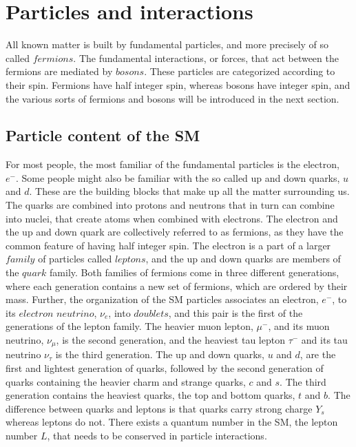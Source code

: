 \section{Particles and interactions}  
\noindent\justify
All known matter is built by fundamental particles, and more precisely of so called $fermions$. 
The fundamental interactions, or forces, that act between the fermions are mediated by $bosons$. 
These particles are categorized according to their spin. 
Fermions have half integer spin, whereas bosons have integer spin, and the various sorts of fermions and bosons will be introduced in the next section. 
\subsection*{Particle content of the SM}  
\noindent\justify
For most people, the most familiar of the fundamental particles is the electron, $e^{-}$. 
Some people might also be familiar with the so called up and down quarks, $u$ and $d$. 
These are the building blocks that make up all the matter surrounding us. 
The quarks are combined into protons and neutrons that in turn can combine into nuclei, that create atoms when combined with electrons. 
The electron and the up and down quark are collectively referred to as fermions, as they have the common feature of having half integer spin. 
The electron is a part of a larger $family$ of particles called $leptons$, and the up and down quarks are members of the $quark$ family.
Both families of fermions come in three different generations, where each generation contains a new set of fermions, which are ordered by their mass. 
Further, the organization of the SM particles associates an electron, $e^{-}$, to its $electron$ $neutrino$, $\nu_{e}$, into $doublets$, and this pair is the first of the generations of the lepton family. 
The heavier muon lepton, $\mu^{-}$, and its muon neutrino, $\nu_{\mu}$, is the second generation, and the heaviest tau lepton $\tau^{-}$ and its tau neutrino $\nu_{\tau}$ is the third generation.  
The up and down quarks, $u$ and $d$, are the first and lightest generation of quarks, followed by the second generation of quarks containing the heavier charm and strange quarks, $c$ and $s$. 
The third generation contains the heaviest quarks, the top and bottom quarks, $t$ and $b$. 
The difference between quarks and leptons is that quarks carry strong charge $Y_{s}$ whereas leptons do not.
\newpara
\noindent\justify
There exists a quantum number in the SM, the lepton number $L$, that needs to be conserved in particle interactions.
